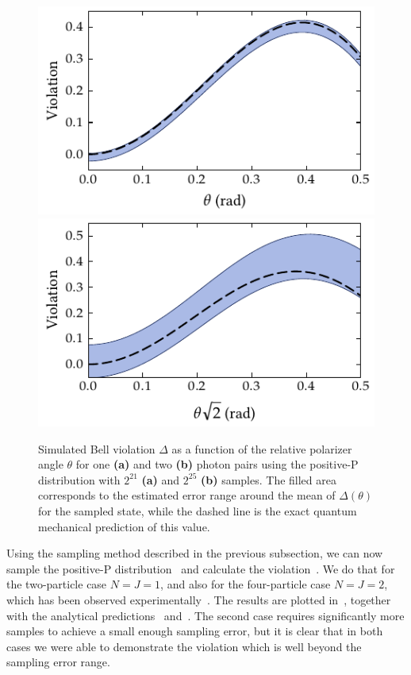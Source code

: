 \begin{figure}
    \centerline{%
    \includegraphics{figures_generated/bell/cooperative_N1.pdf}%
    \includegraphics{figures_generated/bell/cooperative_N2.pdf}}

    \caption{
    Simulated Bell violation $\Delta$ as a function of the relative polarizer angle $\theta$ for one \textbf{(a)} and two \textbf{(b)} photon pairs using the positive-P distribution with $2^{21}$ \textbf{(a)} and $2^{25}$ \textbf{(b)} samples.
    The filled area corresponds to the estimated error range around the mean of $\Delta(\theta)$ for the sampled state, while the dashed line is the exact quantum mechanical prediction of this value.}

    \label{fig:bell-ineq:cooperative:violation}
\end{figure}

Using the sampling method described in the previous subsection, we can now sample the positive-P distribution~ and calculate the violation~.
We do that for the two-particle case $N=J=1$, and also for the four-particle case $N=J=2$, which has been observed experimentally~\cite{Howell2002}.
The results are plotted in~, together with the analytical predictions~ and~.
The second case requires significantly more samples to achieve a small enough sampling error, but it is clear that in both cases we were able to demonstrate the violation which is well beyond the sampling error range.
